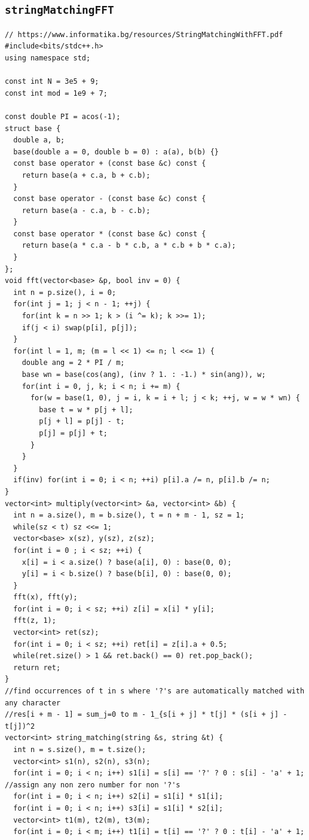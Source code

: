 \subsection{\texttt{stringMatchingFFT}}
\begin{lstlisting}
// https://www.informatika.bg/resources/StringMatchingWithFFT.pdf
#include<bits/stdc++.h>
using namespace std;

const int N = 3e5 + 9;
const int mod = 1e9 + 7;

const double PI = acos(-1);
struct base {
  double a, b;
  base(double a = 0, double b = 0) : a(a), b(b) {}
  const base operator + (const base &c) const {
    return base(a + c.a, b + c.b);
  }
  const base operator - (const base &c) const {
    return base(a - c.a, b - c.b);
  }
  const base operator * (const base &c) const {
    return base(a * c.a - b * c.b, a * c.b + b * c.a);
  }
};
void fft(vector<base> &p, bool inv = 0) {
  int n = p.size(), i = 0;
  for(int j = 1; j < n - 1; ++j) {
    for(int k = n >> 1; k > (i ^= k); k >>= 1);
    if(j < i) swap(p[i], p[j]);
  }
  for(int l = 1, m; (m = l << 1) <= n; l <<= 1) {
    double ang = 2 * PI / m;
    base wn = base(cos(ang), (inv ? 1. : -1.) * sin(ang)), w;
    for(int i = 0, j, k; i < n; i += m) {
      for(w = base(1, 0), j = i, k = i + l; j < k; ++j, w = w * wn) {
        base t = w * p[j + l];
        p[j + l] = p[j] - t;
        p[j] = p[j] + t;
      }
    }
  }
  if(inv) for(int i = 0; i < n; ++i) p[i].a /= n, p[i].b /= n;
}
vector<int> multiply(vector<int> &a, vector<int> &b) {
  int n = a.size(), m = b.size(), t = n + m - 1, sz = 1;
  while(sz < t) sz <<= 1;
  vector<base> x(sz), y(sz), z(sz);
  for(int i = 0 ; i < sz; ++i) {
    x[i] = i < a.size() ? base(a[i], 0) : base(0, 0);
    y[i] = i < b.size() ? base(b[i], 0) : base(0, 0);
  }
  fft(x), fft(y);
  for(int i = 0; i < sz; ++i) z[i] = x[i] * y[i];
  fft(z, 1);
  vector<int> ret(sz);
  for(int i = 0; i < sz; ++i) ret[i] = z[i].a + 0.5;
  while(ret.size() > 1 && ret.back() == 0) ret.pop_back();
  return ret;
}
//find occurrences of t in s where '?'s are automatically matched with any character
//res[i + m - 1] = sum_j=0 to m - 1_{s[i + j] * t[j] * (s[i + j] - t[j])^2
vector<int> string_matching(string &s, string &t) {
  int n = s.size(), m = t.size();
  vector<int> s1(n), s2(n), s3(n);
  for(int i = 0; i < n; i++) s1[i] = s[i] == '?' ? 0 : s[i] - 'a' + 1; //assign any non zero number for non '?'s
  for(int i = 0; i < n; i++) s2[i] = s1[i] * s1[i];
  for(int i = 0; i < n; i++) s3[i] = s1[i] * s2[i];
  vector<int> t1(m), t2(m), t3(m);
  for(int i = 0; i < m; i++) t1[i] = t[i] == '?' ? 0 : t[i] - 'a' + 1;

\end{lstlisting}
